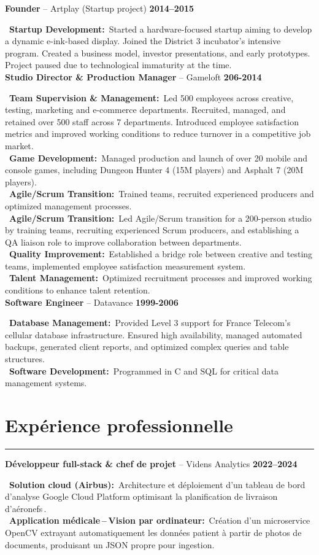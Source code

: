 \documentclass[a4paper,10pt]{article}
\newif\ifpandocconvert
\newcommand{\resumeSection}[2]{%
  \ifpandocconvert %
    \par\addvspace{1em}\noindent\textbf{#1}\par\addvspace{0.5em}%
    #2%
    \par\addvspace{0.3em}%
  \else %
    \section*{#1}%
    \vspace{-2em} %
    \noindent\rule{\textwidth}{0.4pt}%
    \vspace{0.5em} %
    #2%
    \vspace{0.3em}%
  \fi
}
\newcommand{\resumeItem}[3]{%
  \noindent\textbf{#1} -- #2 \hfill \textbf{#3} \\
  \vspace{0.3em}
}
\newcommand{\jobItem}[2]{%
  \noindent
  \textbullet\ \textbf{#1\ifthenelse{\boolean{EN}}{}{ }:}~#2\vspace{0.3em} \\
}
\begin{document}
{{    \vspace{1em}
    \resumeItem{Founder}{Artplay (Startup project)}{2014–2015}
    \jobItem{Startup Development}{Started a hardware-focused startup aiming to develop a dynamic e-ink-based display. Joined the District 3 incubator’s intensive program. Created a business model, investor presentations, and early prototypes. Project paused due to technological immaturity at the time.}
    \vspace{1em}
    \resumeItem{Studio Director \& Production Manager}{Gameloft}{206-2014}
    \jobItem{Team Supervision \& Management}{Led 500 employees across creative, testing, marketing and e-commerce departments. Recruited, managed, and retained over 500 staff across 7 departments. Introduced employee satisfaction metrics and improved working conditions to reduce turnover in a competitive job market.}
    \jobItem{Game Development}{Managed production and launch of over 20 mobile and console games, including Dungeon Hunter 4 (15M players) and Asphalt 7 (20M players).}
    \jobItem{Agile/Scrum Transition}{Trained teams, recruited experienced producers and optimized management processes.}
    \jobItem{Agile/Scrum Transition}{Led Agile/Scrum transition for a 200-person studio by training teams, recruiting experienced Scrum producers, and establishing a QA liaison role to improve collaboration between departments.}
    \jobItem{Quality Improvement}{Established a bridge role between creative and testing teams, implemented employee satisfaction measurement system.}
    \jobItem{Talent Management}{Optimized recruitment processes and improved working conditions to enhance talent retention.}
    \vspace{1em}
    \resumeItem{Software Engineer}{Datavance}{1999-2006}
    \jobItem{Database Management}{Provided Level 3 support for France Telecom's cellular database infrastructure. Ensured high availability, managed automated backups, generated client reports, and optimized complex queries and table structures.}
    \jobItem{Software Development}{Programmed in C and SQL for critical data management systems.}
  }
}{%
  \resumeSection{Expérience professionnelle}{
    \resumeItem{Développeur full-stack \& chef de projet}{Videns Analytics}{2022–2024}
    \jobItem{Solution cloud (Airbus)}{Architecture et déploiement d'un tableau de bord d'analyse Google Cloud Platform optimisant la planification de livraison d'aéronefs .}
    \jobItem{Application médicale – Vision par ordinateur}{Création d'un microservice OpenCV extrayant automatiquement les données patient à partir de photos de documents, produisant un JSON propre pour ingestion.}
}}
\end{document}
